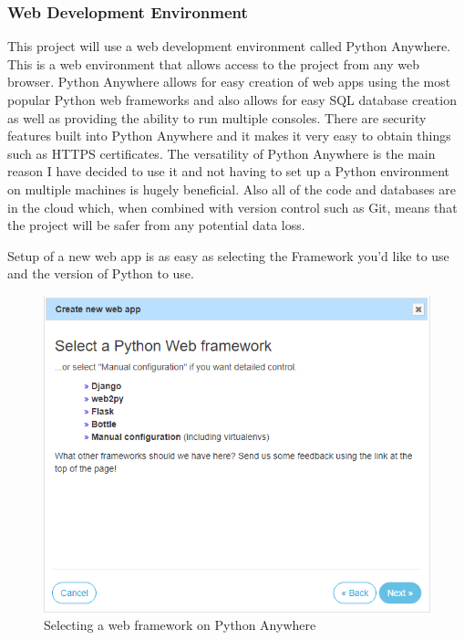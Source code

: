\documentclass[10pt,a4paper]{article}
\begin{document}
\subsubsection{Web Development Environment}
This project will use a web development environment called Python Anywhere. This is a web environment that allows access to the project from any web browser. Python Anywhere allows for easy creation of web apps using the most popular Python web frameworks and also allows for easy SQL database creation as well as providing the ability to run multiple consoles. There are security features built into Python Anywhere and it makes it very easy to obtain things such as HTTPS certificates. The versatility of Python Anywhere is the main reason I have decided to use it and not having to set up a Python environment on multiple machines is hugely beneficial. Also all of the code and databases are in the cloud which, when combined with version control such as Git, means that the project will be safer from any potential data loss.

Setup of a new web app is as easy as selecting the Framework you'd like to use and the version of Python to use.

\begin{figure}[H]
\centering
  \includegraphics[width=\linewidth]{images/webappframework.png}
  \caption{Selecting a web framework on Python Anywhere}
  \label{fig:webappframework}
\end{figure}
\end{document}
